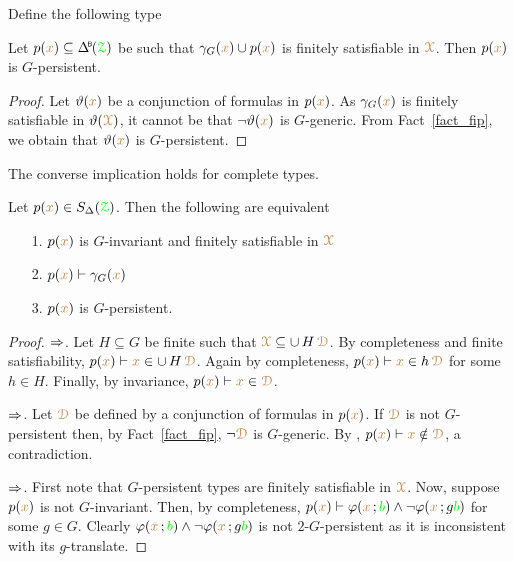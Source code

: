 Define the following type


\begin{corollary}\label{corol_q_pers}
  Let $p({\mr x})\subseteq\BDelta(\grZ)$ be such that $\gamma_G({\color{brown} x})\cup p({\color{brown} x})$ is finitely satisfiable in ${\color{brown}\EuScript X}$.
  Then $p({\color{brown} x})$ is $G$-persistent.
\end{corollary}

\begin{proof}
  Let $\vartheta({\color{brown} x})$ be a conjunction of formulas in $p({\color{brown} x})$.
  As $\gamma_G({\color{brown} x})$ is finitely satisfiable in $\vartheta({\color{brown}\EuScript X})$, it cannot be that $\neg\vartheta({\color{brown} x})$ is $G$-generic.
  From Fact~\ref{fact_fip}, we obtain that $\vartheta({\color{brown} x})$ is $G$-persistent.
\end{proof}

The converse implication holds for complete types.

\begin{theorem}\label{thm_generic_invariant}
  Let $p({\color{brown} x})\in S_\Delta({\color{green}\EuScript Z})$.
  Then the following are equivalent
  \begin{itemize}
    \item[1.] $p({\color{brown} x})$ is $G$-invariant and finitely satisfiable in ${\color{brown}\EuScript X}$
    \item[2.] $p({\color{brown} x})\vdash\gamma_G({\color{brown} x})$
    \item[3.] $p({\color{brown} x})$ is $G$-persistent.
  \end{itemize}
\end{theorem}

\begin{proof}
  $\Rightarrow$.
  Let $H\subseteq G$ be finite such that ${\color{brown}\EuScript X}\subseteq\cup\,H\,{\color{brown}\EuScript D}$.
  By completeness and finite satisfiability, $p({\color{brown} x})\vdash {\color{brown}x}\in\cup\,H\,{\color{brown}\EuScript D}$.
  Again by completeness, $p({\color{brown} x})\vdash {\color{brown}x}\in h\,{\color{brown}\EuScript D}$ for some $h\in H$.
  Finally, by invariance,  $p({\color{brown} x})\vdash{\color{brown}x}\in{\color{brown}\EuScript D}$.
  
  $\Rightarrow$.
  Let ${\color{brown}\EuScript D}$ be defined by a conjunction of formulas in $p({\color{brown} x})$.
  If ${\color{brown}\EuScript D}$ is not $G$-persistent then, by Fact~\ref{fact_fip}, $\neg{\color{brown}\EuScript D}$ is $G$-generic. 
  By , $p({\color{brown} x})\vdash{\color{brown}x}\notin{\color{brown}\EuScript D}$, a contradiction.

  $\Rightarrow$.
  First note that $G$-persistent types are finitely satisfiable in ${\color{brown}\EuScript X}$.
  Now, suppose $p({\color{brown} x})$ is not $G$-invariant.
  Then, by completeness, $p({\color{brown} x})\vdash\varphi({\color{brown} x}\,;{\color{green} b})\wedge\neg\varphi({\color{brown} x}\,;g{\color{green} b})$ for some $g\in G$.
  Clearly $\varphi({\color{brown} x}\,;{\color{green} b})\wedge\neg\varphi({\color{brown} x}\,;g{\color{green} b})$ is not $2$-$G$-persistent as it is inconsistent with its $g$-translate.
\end{proof}


